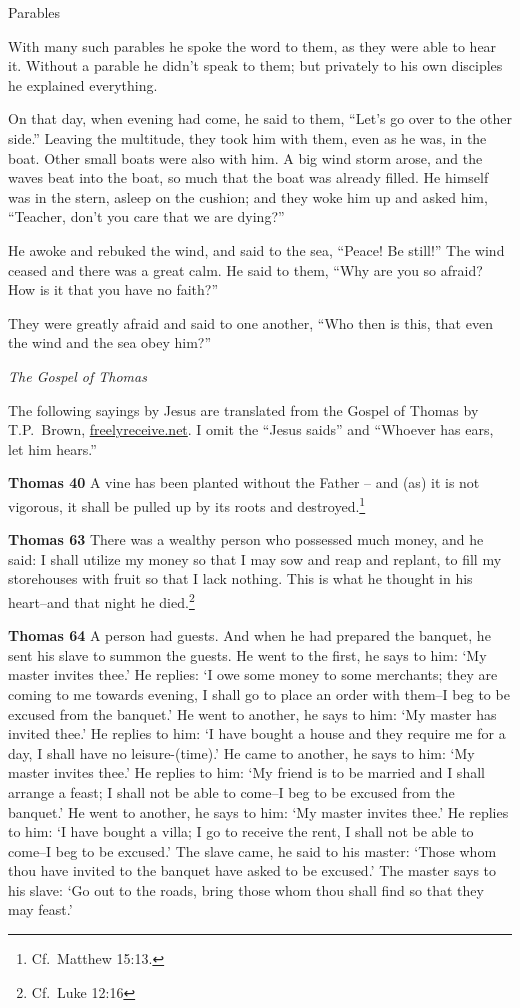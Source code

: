 \documentclass[10pt,twoside]{article} %
\newcommand{\quotesize}{\normalsize{}}
\newcommand{\comm}[1]{\begingroup \color{black!50} #1\endgroup}
\newenvironment{quotetext}{\begingroup\quotesize}{\endgroup}
\newcommand{\bible}[2]{\begin{quotetext}\textbf{#1} #2\end{quotetext}}
\newcommand{\thomas}[2]{\bible{Thomas #1}{#2}}
\newcommand{\subhead}[1]{\emph{#1}\par}
\begin{document}
\begin{section}{Parables}
{  With many such parables he spoke the word to them, as they were able to hear it.   Without a parable he didn't speak to them; but privately to his own disciples he explained everything.

  On that day, when evening had come, he said to them, ``Let's go over to the other side.''   Leaving the multitude, they took him with them, even as he was, in the boat. Other small boats were also with him.   A big wind storm arose, and the waves beat into the boat, so much that the boat was already filled.   He himself was in the stern, asleep on the cushion; and they woke him up and asked him, ``Teacher, don't you care that we are dying?''

  He awoke and rebuked the wind, and said to the sea, ``Peace! Be still!'' The wind ceased and there was a great calm.   He said to them, ``Why are you so afraid? How is it that you have no faith?''

  They were greatly afraid and said to one another, ``Who then is this, that even the wind and the sea obey him?'' 
}

\subhead{The Gospel of Thomas}

\comm{The following sayings by Jesus are translated from the Gospel of Thomas by T.P.~Brown, \url{freelyreceive.net}. I omit the ``Jesus saids''
and ``Whoever has ears, let him hears.''}


\thomas{40}{
A vine has been planted without the Father -- and (as) it is not vigorous, it shall be pulled up by its roots and destroyed.\footnote{Cf.~Matthew 15:13.}
}

\thomas{63}{
There was a wealthy person who possessed much money, and he said: I shall utilize my money so that I may sow and reap and replant, to fill my storehouses with fruit so that I lack nothing. This is what he thought in his heart--and that night he died.\footnote{Cf.~Luke 12:16}
}

\thomas{64}{
A person had guests. And when he had prepared the banquet, he sent his slave to summon the guests. He went to the first, he says to him: `My master invites thee.' He replies: `I owe some money to some merchants; they are coming to me towards evening, I shall go to place an order with them--I beg to be excused from the banquet.' He went to another, he says to him: `My master has invited thee.' He replies to him: `I have bought a house and they require me for a day, I shall have no leisure-(time).' He came to another, he says to him: `My master invites thee.' He replies to him: `My friend is to be married and I shall arrange a feast; I shall not be able to come--I beg to be excused from the banquet.' He went to another, he says to him: `My master invites thee.' He replies to him: `I have bought a villa; I go to receive the rent, I shall not be able to come--I beg to be excused.' The slave came, he said to his master: `Those whom thou have invited to the banquet have asked to be excused.' The master says to his slave: `Go out to the roads, bring those whom thou shall find so that they may feast.'
}


\end{section}
\end{document}
